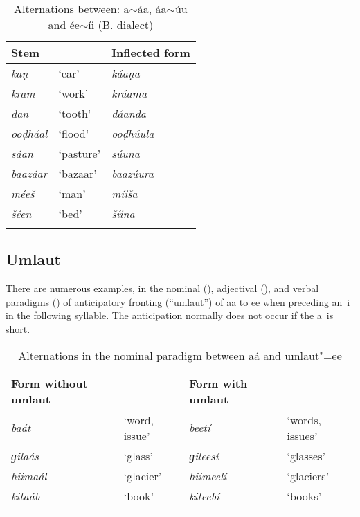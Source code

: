 \begin{table}[ht]
\caption{Alternations between: a$\sim$áa, áa$\sim$úu and ée$\sim$íi (B. dialect)}
\begin{tabularx}{\textwidth}{ Q Q Q }
\lsptoprule
Stem &
&
Inflected form\\\hline
\textit{kaṇ} &
`ear' &
\textit{káaṇa} \\
\textit{kram} &
`work' &
\textit{kráama} \\
\textit{dan} &
`tooth' &
\textit{dáanda} \\
\textit{ooḍháal} &
`flood' &
\textit{ooḍhúula} \\
\textit{sáan} &
`pasture' &
\textit{súuna} \\
\textit{baazáar} &
`bazaar' &
\textit{baazúura} \\
\textit{méeš} &
`man' &
\textit{míiša} \\
\textit{šéen} &
`bed' &
\textit{šíina} \\\lspbottomrule
\end{tabularx}
\label{tab:3-15}
\end{table}

\subsection{Umlaut}
\label{subsec:3-5-3}

There are numerous examples, in the nominal (), adjectival (), and verbal paradigms () of anticipatory fronting (``umlaut'') of aa to ee when preceding an~i in the following syllable. The anticipation normally does not occur if the a~is short. 


\begin{table}[ht]
\caption{Alternations in the nominal paradigm between aá and umlaut"=ee}
\begin{tabularx}{\textwidth}{ Q Q Q Q }
\lsptoprule
Form without umlaut &
&
Form with umlaut &
\\\hline
\textit{baát} &
`word, issue' &
\textit{beetí} &
`words, issues'\\
\textit{ɡilaás} &
`glass' &
\textit{ɡileesí} &
`glasses'\\
\textit{hiimaál} &
`glacier' &
\textit{hiimeelí} &
`glaciers'\\
\textit{kitaáb} &
`book' &
\textit{kiteebí} &
`books'\\\lspbottomrule
\end{tabularx}
\label{tab:3-16}
\end{table}


